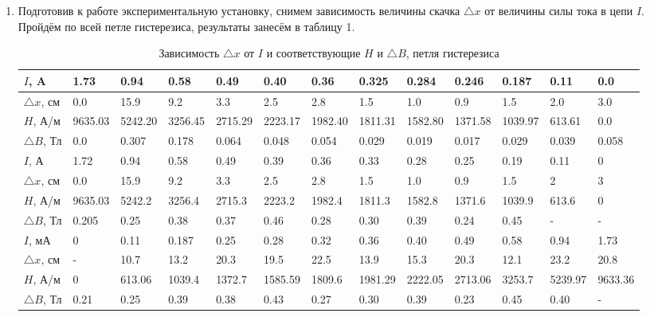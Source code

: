 \documentclass[a4paper]{article}
\begin{document}
\begin{enumerate}
    \item Подготовив к работе экспериментальную установку, снимем зависимость величины скачка $\triangle x$ от величины силы тока в цепи $I$. Пройдём по всей петле гистерезиса, результаты занесём в таблицу 1.
    
    \begin{table}[h]
    \centering
    \begin{center}
    \caption{Зависимость $\triangle x$ от $I$ и соответствующие $H$ и $\triangle B$, петля гистерезиса}
    \end{center}
    \vspace{0.1cm}
    \label{tab:my_label}
    \begin{tabular}{ |p{1.2cm}||p{1cm}|p{1cm}|p{1cm}|p{1cm}|p{1cm}|p{1cm}|p{1cm}|p{1cm}|p{1cm}|p{1cm}|p{1cm}|p{1cm}| }
    \hline
        $I$, A & 1.73 & 0.94 & 0.58 & 0.49 & 0.40 & 0.36 & 0.325 & 0.284 & 0.246 & 0.187 & 0.11 & 0.0\\
\hline
    $\triangle x$, см & 0.0 & 15.9 & 9.2 & 3.3 & 2.5 & 2.8 & 1.5 & 1.0 & 0.9 & 1.5 & 2.0 & 3.0\\
\hline
    $H$, А/м & 9635.03 & 5242.20 & 3256.45 & 2715.29 & 2223.17 & 1982.40 & 1811.31 & 1582.80 & 1371.58 & 1039.97 & 613.61 & 0.0 \\
\hline
    $\triangle B$, Тл & 0.0 & 0.307 & 0.178 & 0.064 & 0.048 & 0.054 & 0.029 & 0.019 & 0.017 & 0.029 & 0.039 & 0.058\\
\hline
\hline

    $I$, А & 1.72 & 0.94 & 0.58 & 0.49 & 0.39 & 0.36 & 0.33 & 0.28 & 0.25 & 0.19 & 0.11 & 0\\
\hline
    $\triangle x$, см & 0.0 & 15.9 & 9.2 & 3.3 & 2.5 & 2.8 & 1.5 & 1.0 & 0.9 & 1.5 & 2 & 3 \\
\hline
    $H$, А/м & 9635.03 & 5242.2 & 3256.4 & 2715.3 & 2223.2 & 1982.4 & 1811.3 & 1582.8 & 1371.6 & 1039.9 & 613.6 & 0 \\
\hline 
    $\triangle B$, Тл & 0.205 & 0.25 & 0.38 & 0.37 & 0.46 & 0.28 & 0.30 & 0.39 & 0.24 & 0.45 & - & -\\
    
\hline
\hline

    $I$, мА & 0 & 0.11 & 0.187 & 0.25 & 0.28 & 0.32 & 0.36 & 0.40 & 0.49 & 0.58 & 0.94 & 1.73 \\
\hline
    $\triangle x$, см & - & 10.7 & 13.2 & 20.3 & 19.5 & 22.5 & 13.9 & 15.3 & 20.3 & 12.1 & 23.2 & 20.8 \\
\hline
    $H$, А/м & 0 & 613.06 & 1039.4 & 1372.7 & 1585.59 & 1809.6 & 1981.29 & 2222.05 & 2713.06 & 3253.7 & 5239.97 & 9633.36\\
\hline 
    $\triangle B$, Тл & 0.21 & 0.25 & 0.39 & 0.38 & 0.43 & 0.27 & 0.30 & 0.39 & 0.23 & 0.45 & 0.40 & - \\
\hline
\hline


\end{tabular}
\end{table}
\end{enumerate}
\end{document}
